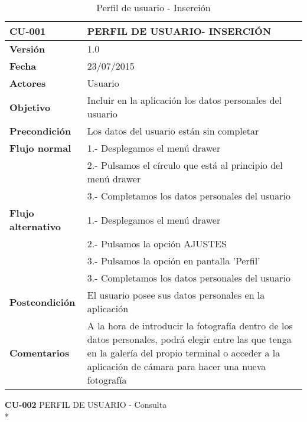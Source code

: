 \documentclass[../pfc.tex]{subfiles}
\begin{document}
	\begin{table}[H]
		\centering
		\begin{tabular}[t]{|p{3cm}|p{9.5cm}|}
				\hline \textbf{CU-001} & \textbf{PERFIL DE USUARIO- INSERCIÓN} \\*
				\hline\hline \textbf{Versión} & 1.0 \\*
				\hline\hline \textbf{Fecha} & 23/07/2015 \\*
				\hline\textbf{Actores} 	& Usuario\\*
				\hline \textbf{Objetivo} & Incluir en la aplicación los datos personales del usuario\\* 			
				\hline \textbf{Precondición} & Los datos del usuario están sin completar \\* 
				\hline \textbf{Flujo normal} & 1.- Desplegamos el menú drawer \\* 
											 & 2.- Pulsamos el círculo que está al principio del menú drawer \\*	
											 & 3.- Completamos los datos personales del usuario\\*	
				\hline \textbf{Flujo alternativo} & 1.- Desplegamos el menú drawer \\* 
 												  & 2.- Pulsamos la opción AJUSTES \\*	
												  & 3.- Pulsamos la opción en pantalla 'Perfil' \\*	
												  & 3.- Completamos los datos personales del usuario \\*	
				\hline \textbf{Postcondición} & El usuario posee sus datos personales en la aplicación \\* 
				\hline \textbf{Comentarios}   & A la hora de introducir la fotografía dentro de los datos personales, podrá elegir entre las que tenga en la galería del propio terminal o acceder a la aplicación de cámara para hacer una nueva fotografía\\*
				\hline
			\end{tabular}
			\caption{Perfil de usuario - Inserción}
			\label{tabla:caso001}
	\end{table}
		
	\textbf{CU-002}	PERFIL DE USUARIO - Consulta\\*
	
\end{document}

